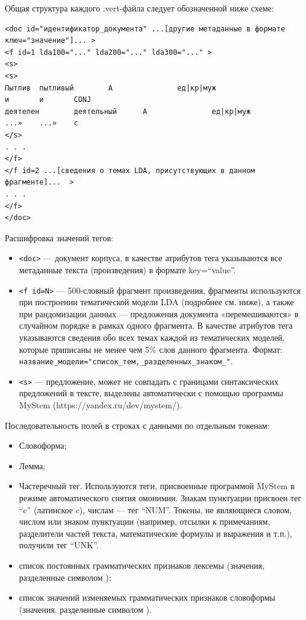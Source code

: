 \documentclass[
]{article}
\providecommand{\tightlist}{%
  \setlength{\itemsep}{0pt}\setlength{\parskip}{0pt}}
\begin{document}
Общая структура каждого .vert-файла следует обозначенной ниже схеме:

\begin{verbatim}
<doc id="идентификатор_документа" ...[другие метаданные в формате ключ="значение"]... >
<f id=1 lda100="..." lda200="..." lda300="..." >
<s>
<s>
Пытлив  пытливый        A               ед|кр|муж
и       и       CONJ
деятелен        деятельный      A               ед|кр|муж
...»    ...»    c
</s>
. . .
</f>
</f id=2 ...[сведения о темах LDA, присутствующих в данном фрагменте]...  >
. . .
</f>
</doc>
\end{verbatim}

Расшифровка значений тегов:

\begin{itemize}
\tightlist
\item
  \texttt{\textless{}doc\textgreater{}} --- документ корпуса, в качестве
  атрибутов тега указываются все метаданные текста (произведения) в
  формате key=``value''.
\item
  \texttt{\textless{}f\ id=N\textgreater{}} --- 500-словный фрагмент
  произведения, фрагменты используются при построении тематической
  модели LDA (подробнее см. ниже), а также при рандомизации данных ---
  предложения документа «перемешиваются» в случайном порядке в рамках
  одного фрагмента. В качестве атрибутов тега указываются сведения обо
  всех темах каждой из тематических моделей, которые приписаны не менее
  чем 5\% слов данного фрагмента. Формат:
  \texttt{название\_модели="список\_тем,\_разделенных\_знаком\_\textbar{}"}.
\item
  \texttt{\textless{}s\textgreater{}} --- предложение, может не
  совпадать с границами синтаксических предложений в тексте, выделены
  автоматически с помощью программы MyStem
  (https://yandex.ru/dev/mystem/).
\end{itemize}

Последовательность полей в строках с данными по отдельным токенам:

\begin{itemize}
\tightlist
\item
  Словоформа;
\item
  Лемма;
\item
  Частеречный тег. Используются теги, присвоенные программой MyStem в
  режиме автоматического снятия омонимии. Знакам пунктуации присвоен тег
  ``c'' (латинское c), числам --- тег ``NUM''. Токены, не являющиеся
  словом, числом или знаком пунктуации (например, отсылки к примечаниям,
  разделители частей текста, математические формулы и выражения и т.п.),
  получили тег ``UNK''.
\item
  список постоянных грамматических признаков лексемы (значения,
  разделенные символом \textbar);
\item
  список значений изменяемых грамматических признаков словоформы
  (значения, разделенные символом \textbar).
\end{itemize}
\end{document}
